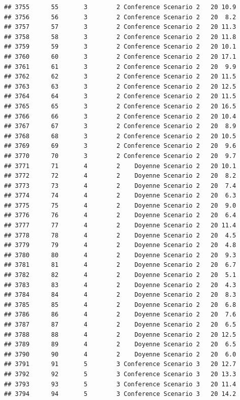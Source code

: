 \documentclass[
]{article}
\begin{document}
\begin{verbatim}
## 3755      55       3        2 Conference Scenario 2   20 10.9
## 3756      56       3        2 Conference Scenario 2   20  8.2
## 3757      57       3        2 Conference Scenario 2   20 11.3
## 3758      58       3        2 Conference Scenario 2   20 11.8
## 3759      59       3        2 Conference Scenario 2   20 10.1
## 3760      60       3        2 Conference Scenario 2   20 17.1
## 3761      61       3        2 Conference Scenario 2   20  9.9
## 3762      62       3        2 Conference Scenario 2   20 11.5
## 3763      63       3        2 Conference Scenario 2   20 12.5
## 3764      64       3        2 Conference Scenario 2   20 11.5
## 3765      65       3        2 Conference Scenario 2   20 16.5
## 3766      66       3        2 Conference Scenario 2   20 10.4
## 3767      67       3        2 Conference Scenario 2   20  8.9
## 3768      68       3        2 Conference Scenario 2   20 10.5
## 3769      69       3        2 Conference Scenario 2   20  9.6
## 3770      70       3        2 Conference Scenario 2   20  9.7
## 3771      71       4        2    Doyenne Scenario 2   20 10.1
## 3772      72       4        2    Doyenne Scenario 2   20  8.2
## 3773      73       4        2    Doyenne Scenario 2   20  7.4
## 3774      74       4        2    Doyenne Scenario 2   20  6.3
## 3775      75       4        2    Doyenne Scenario 2   20  9.0
## 3776      76       4        2    Doyenne Scenario 2   20  6.4
## 3777      77       4        2    Doyenne Scenario 2   20 11.4
## 3778      78       4        2    Doyenne Scenario 2   20  4.5
## 3779      79       4        2    Doyenne Scenario 2   20  4.8
## 3780      80       4        2    Doyenne Scenario 2   20  9.3
## 3781      81       4        2    Doyenne Scenario 2   20  6.7
## 3782      82       4        2    Doyenne Scenario 2   20  5.1
## 3783      83       4        2    Doyenne Scenario 2   20  4.3
## 3784      84       4        2    Doyenne Scenario 2   20  8.3
## 3785      85       4        2    Doyenne Scenario 2   20  6.8
## 3786      86       4        2    Doyenne Scenario 2   20  7.6
## 3787      87       4        2    Doyenne Scenario 2   20  6.5
## 3788      88       4        2    Doyenne Scenario 2   20 12.5
## 3789      89       4        2    Doyenne Scenario 2   20  6.5
## 3790      90       4        2    Doyenne Scenario 2   20  6.0
## 3791      91       5        3 Conference Scenario 3   20 12.7
## 3792      92       5        3 Conference Scenario 3   20 13.3
## 3793      93       5        3 Conference Scenario 3   20 11.4
## 3794      94       5        3 Conference Scenario 3   20 14.2

\end{verbatim}
\end{document}
